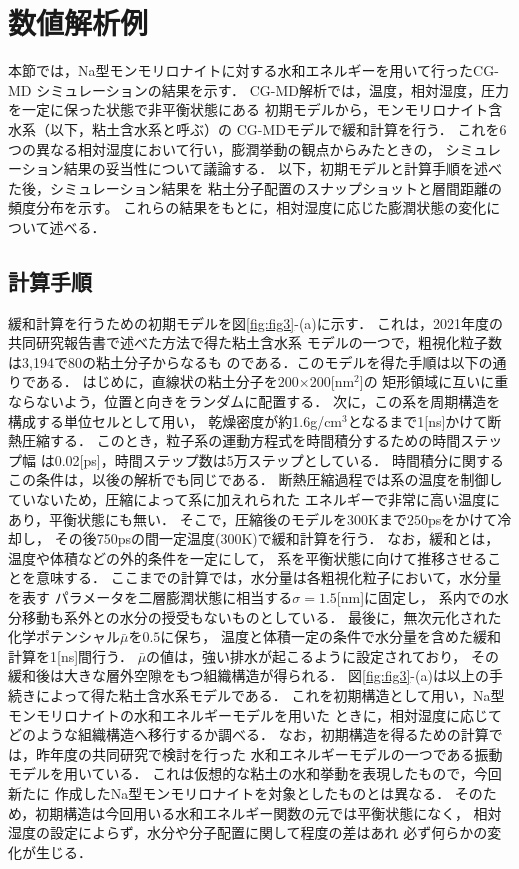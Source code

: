 \section{数値解析例}
本節では，Na型モンモリロナイトに対する水和エネルギーを用いて行ったCG-MD
シミュレーションの結果を示す．
CG-MD解析では，温度，相対湿度，圧力を一定に保った状態で非平衡状態にある
初期モデルから，モンモリロナイト含水系（以下，粘土含水系と呼ぶ）の
CG-MDモデルで緩和計算を行う．
これを6つの異なる相対湿度において行い，膨潤挙動の観点からみたときの，
シミュレーション結果の妥当性について議論する．
以下，初期モデルと計算手順を述べた後，シミュレーション結果を
粘土分子配置のスナップショットと層間距離の頻度分布を示す。
これらの結果をもとに，相対湿度に応じた膨潤状態の変化について述べる．
\subsection{計算手順}
緩和計算を行うための初期モデルを図\ref{fig:fig3}-(a)に示す．
これは，2021年度の共同研究報告書で述べた方法で得た粘土含水系
モデルの一つで，粗視化粒子数は3,194で80の粘土分子からなるも
のである．このモデルを得た手順は以下の通りである．
はじめに，直線状の粘土分子を200$\times$200[nm$^2$]の
矩形領域に互いに重ならないよう，位置と向きをランダムに配置する．
次に，この系を周期構造を構成する単位セルとして用い，
乾燥密度が約1.6g/cm$^{3}$となるまで1[ns]かけて断熱圧縮する．
このとき，粒子系の運動方程式を時間積分するための時間ステップ幅
は0.02[ps]，時間ステップ数は5万ステップとしている．
時間積分に関するこの条件は，以後の解析でも同じである．
断熱圧縮過程では系の温度を制御していないため，圧縮によって系に加えれられた
エネルギーで非常に高い温度にあり，平衡状態にも無い．
そこで，圧縮後のモデルを300Kまで$250$psをかけて冷却し，
その後750psの間一定温度(300K)で緩和計算を行う．
なお，緩和とは，温度や体積などの外的条件を一定にして，
系を平衡状態に向けて推移させることを意味する．
ここまでの計算では，水分量は各粗視化粒子において，水分量を表す
パラメータを二層膨潤状態に相当する$\sigma=1.5$[nm]に固定し，
系内での水分移動も系外との水分の授受もないものとしている．
最後に，無次元化された化学ポテンシャル$\bar \mu$を$0.5$に保ち，
温度と体積一定の条件で水分量を含めた緩和計算を1[ns]間行う．
$\bar \mu$の値は，強い排水が起こるように設定されており，
その緩和後は大きな層外空隙をもつ組織構造が得られる．
図\ref{fig:fig3}-(a)は以上の手続きによって得た粘土含水系モデルである．
これを初期構造として用い，Na型モンモリロナイトの水和エネルギーモデルを用いた
ときに，相対湿度に応じてどのような組織構造へ移行するか調べる．
なお，初期構造を得るための計算では，昨年度の共同研究で検討を行った
水和エネルギーモデルの一つである振動モデルを用いている．
これは仮想的な粘土の水和挙動を表現したもので，今回新たに
作成したNa型モンモリロナイトを対象としたものとは異なる．
そのため，初期構造は今回用いる水和エネルギー関数の元では平衡状態になく，
相対湿度の設定によらず，水分や分子配置に関して程度の差はあれ
必ず何らかの変化が生じる．

